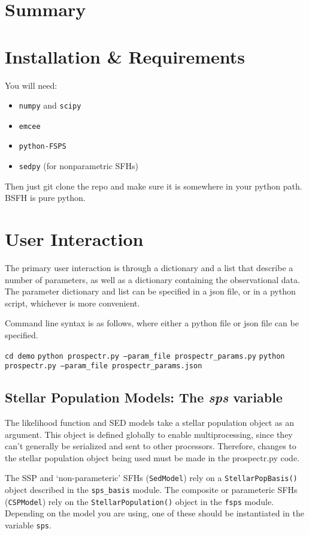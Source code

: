

\section{Summary}

\section{Installation \& Requirements}
You will need:

\begin{itemize}
\item \texttt{numpy} and \texttt{scipy}
\item \texttt{emcee}
\item \texttt{python-FSPS}
\item \texttt{sedpy} (for nonparametric SFHs)
\end{itemize}

Then just git clone the repo and make sure it is somewhere in your
python path.  BSFH is pure python.

\section{User Interaction}
The primary user interaction is through a dictionary and a list that
describe a number of parameters, as well as a dictionary containing
the observational data.  The parameter dictionary and list can be
specified in a json file, or in a python script, whichever is more
convenient.

Command line syntax is as follows, where either a python file or json
file can be specified.
\begin{center}
\texttt{cd demo}
\texttt{python prospectr.py --param_file prospectr_params.py}
\texttt{python prospectr.py --param_file prospectr_params.json}
\end{center}

\subsection{Stellar Population Models: The \emph{sps} variable}
The likelihood function and SED models take a stellar population object
as an argument.  This object is defined globally to enable
multiprocessing, since they can't generally be serialized and sent to
other processors.  Therefore, changes to the stellar population object
being used must be made in the prospectr.py code.

The SSP and `non-parameteric' SFHs (\texttt{SedModel}) rely on a
\texttt{StellarPopBasis()} object described in the \texttt{sps_basis}
module.  The composite or parameteric SFHs (\texttt{CSPModel}) rely on
the \texttt{StellarPopulation()} object in the \texttt{fsps} module.
Depending on the model you are using, one of these should be
instantiated in the variable \texttt{sps}.

